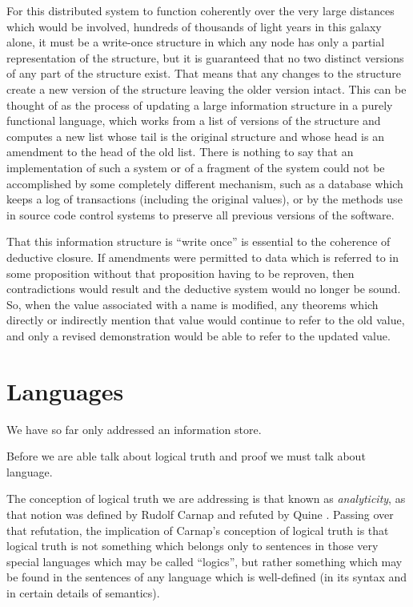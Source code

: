 \documentclass[10pt,titlepage]{article}
\begin{document}
For this distributed system to function coherently over the very large distances which would be involved, hundreds of thousands of light years in this galaxy alone, it must be a write-once structure in which any node has only a partial representation of the structure, but it is guaranteed that no two distinct versions of any part of the structure exist.
That means that any changes to the structure create a new version of the structure leaving the older version intact.
This can be thought of as the process of updating a large information structure in a purely functional language, which works from a list of versions of the structure and computes a new list whose tail is the original structure and whose head is an amendment to the head of the old list.
There is nothing to say that an implementation of such a system or of a fragment of the system could not be accomplished by some completely different mechanism, such as a database which keeps a log of transactions (including the original values), or by the methods use in source code control systems to preserve all previous versions of the software.

That this information structure is ``write once'' is essential to the coherence of deductive closure.
If amendments were permitted to data which is referred to in some proposition without that proposition having to be reproven, then contradictions would result and the deductive system would no longer be sound.
So, when the value associated with a name is modified, any theorems which directly or indirectly mention that value would continue to refer to the old value, and only a revised demonstration would be able to refer to the updated value.

\section{Languages}

We have so far only addressed an information store.

Before we are able talk about logical truth and proof we must talk about language.

The conception of logical truth we are addressing is that known as \emph{analyticity}, as that notion was defined by Rudolf Carnap \cite{carnap47,schilpp63} and refuted by Quine \cite{quine51b,quine61a}.
Passing over that refutation, the implication of Carnap's conception of logical truth  is that logical truth is not something which belongs only to sentences in those very special languages which may be called ``logics'', but rather something which may be found in the sentences of any language which is well-defined (in its syntax and in certain details of semantics).
\end{document}
